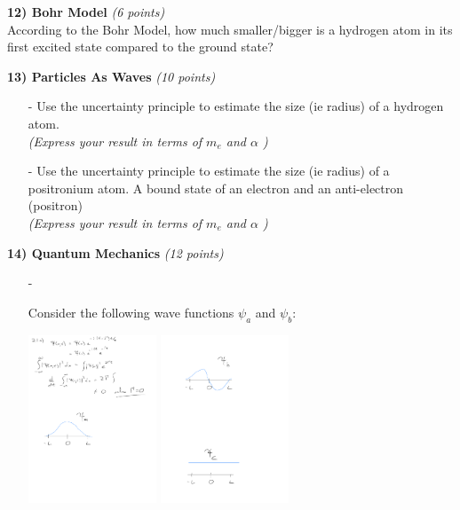 {\clearpage

\textbf{12) Bohr Model} \hfill \textit{(6 points)}\\
According to the Bohr Model, how much smaller/bigger is a hydrogen atom in its first excited state compared to the ground state?

\vfill

\textbf{13) Particles As Waves } \hfill \textit{(10 points)}\\
\begin{itemize}
\item[-] Use the uncertainty principle to estimate the size (ie radius) of a hydrogen atom. \\ \textit{(Express your result in terms of $m_e$ and $\alpha$ )}
\vfill
\item[-] Use the uncertainty principle to estimate the size (ie radius) of a positronium atom. A bound state of an electron and an anti-electron (positron) \\ \textit{(Express your result in terms of $m_e$ and $\alpha$ )}
\vfill
\end{itemize}


\clearpage

\begin{minipage}{\textwidth}
\textbf{14) Quantum Mechanics} \hfill \textit{(12 points)}
\begin{itemize}
\item[-] {Consider the following wave functions $\psi_a$ and $\psi_b$:

\begin{center}
\includegraphics[width=0.3\textwidth]{./psia.pdf}
\hspace{0.3in}
\includegraphics[width=0.3\textwidth]{./psib.pdf}
\end{center}

}
\end{itemize}
\end{minipage}}

